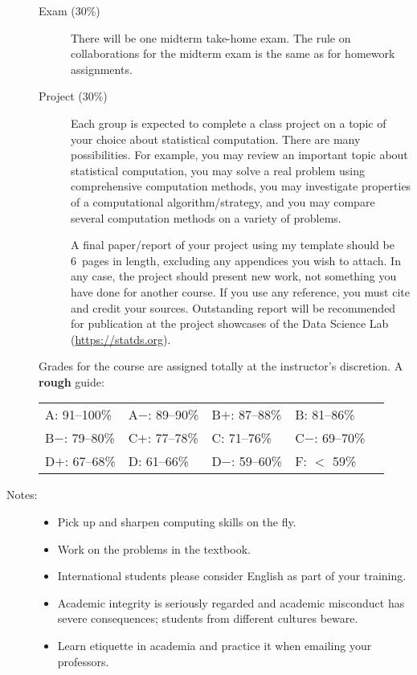 \documentclass[twocolumn]{article}
\begin{document}
\begin{description}
\begin{description}
\item[Exam (30\%)]
There will be one midterm take-home exam. The rule on collaborations for the
midterm exam is the same as for homework assignments.

\item[Project (30\%)]
Each group is expected to complete a class project on a topic of your choice
about statistical computation. There are many possibilities. For example, you
may review an important topic about statistical computation, you may solve a
real problem using comprehensive computation methods, you may investigate
properties of a computational algorithm/strategy, and you may compare several
computation methods on a variety of problems.

A final paper/report of your project using my template should be 6~pages in
length, excluding any appendices you wish to attach. In any case, the project
should present new work, not something you have done for another course.
If you use any reference, you must cite and credit your sources.
Outstanding report will be recommended for publication at the project showcases
of the Data Science Lab (\url{https://statds.org}).


\end{description}


Grades for the course are assigned totally at the instructor's discretion. A \textbf{rough} guide:
\begin{center}
  \begin{tabular}{lllll}
    A: 91--100\% & A$-$: 89--90\% & B$+$: 87--88\% & B: 81--86\%\\
    B$-$: 79--80\%  & C$+$: 77--78\% & C: 71--76\% &  C$-$: 69--70\%\\
    D$+$: 67--68\% &  D: 61--66\%  & D$-$: 59--60\% & F: $<$ 59\%
  \end{tabular}
\end{center}

\item[Notes:]\hspace{0pt}
\small
  \begin{itemize}
  \item Pick up and sharpen computing skills on the fly.
  \item Work on the problems in the textbook.
  \item International students please consider English as part of your training.
  \item Academic integrity is seriously regarded and academic misconduct
    has severe consequences; students from different cultures beware.
  \item Learn etiquette in academia and practice it when emailing your
    professors.
  \end{itemize}

\end{description}
\end{document}
